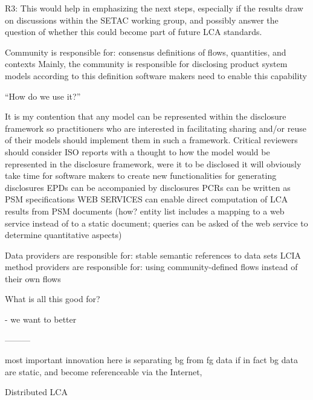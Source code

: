 R3: This would help in emphasizing the next steps, especially if the results draw on discussions within the SETAC working group, and possibly answer the question of whether this could become part of future LCA standards.




Community is responsible for: consensus definitions of flows, quantities, and contexts
Mainly, the community is responsible for disclosing product system models according to this definition
software makers need to enable this capability

``How do we use it?''

It is my contention that any model can be represented within the disclosure framework
so practitioners who are interested in facilitating sharing and/or reuse of their models should implement them in such a framework.
Critical reviewers should consider ISO reports with a thought to how the model would be represented in the disclosure framework, were it to be disclosed
it will obviously take time for software makers to create new functionalities for generating disclosures
EPDs can be accompanied by disclosures
PCRs can be written as PSM specifications
WEB SERVICES can enable direct computation of LCA results from PSM documents (how? entity list includes a mapping to a web service instead of to a static document; queries can be asked of the web service to determine quantitative aspects)


Data providers are responsible for: stable semantic references to data sets
LCIA method providers are responsible for: using community-defined flows instead of their own flows


What is all this good for?

 - we want to better

 ---------

 most important innovation here is separating bg from fg data
 if in fact bg data are static, and become referenceable via the Internet,


 Distributed LCA

 
